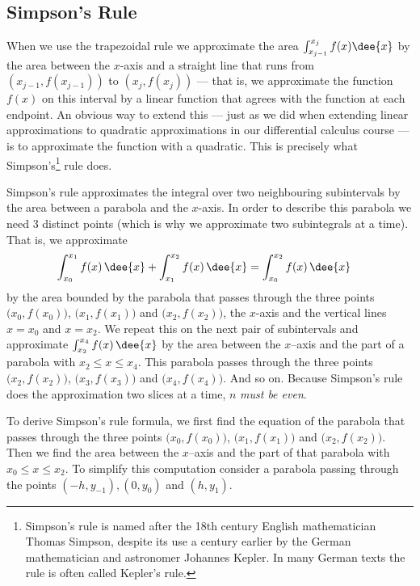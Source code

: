 \subsection{Simpson's Rule}\label{sec:Simpson}
When we use the trapezoidal rule we approximate the area
$\int_{x_{j-1}}^{x_j}f(x)\dee{x}$
by the area between the $x$-axis and a straight line that runs from
$(x_{j-1},f(x_{j-1}))$ to $(x_j, f(x_j))$ --- that is, we approximate the function $f(x)$
on this interval by a linear function that agrees with the function at each
endpoint. An obvious way to extend this --- just as we did when extending linear
approximations to quadratic approximations in our differential calculus course --- is to
approximate the function with a quadratic. This is
precisely what Simpson's\footnote{Simpson's rule is named after the 18th century English
mathematician Thomas Simpson, despite its use a century earlier by the German
mathematician and astronomer Johannes Kepler. In many German texts the rule is often
called Kepler's rule.} rule does.

Simpson's rule approximates the integral over two neighbouring subintervals by the area
between a parabola and the $x$-axis. In order to describe this parabola we need 3
distinct points (which is why we approximate two subintegrals at a time). That is, we
approximate
\begin{align*}
  \int_{x_0}^{x_1} f(x)\,\dee{x} + \int_{x_1}^{x_2} f(x)\,\dee{x}
&= \int_{x_0}^{x_2} f(x)\,\dee{x}
\end{align*}
by the area bounded by the parabola that passes through the three points
$\big(x_0,f(x_0)\big)$, $\big(x_1,f(x_1)\big)$ and $\big(x_2,f(x_2)\big)$, the $x$-axis
and the vertical lines $x=x_0$ and $x=x_2$.
We repeat this on the next pair of subintervals and approximate
$\int_{x_2}^{x_4} f(x)\,\dee{x}$ by the area between the $x$--axis and
the part of a parabola with $x_2\le x\le x_4$. This parabola passes
through the three points $\big(x_2,f(x_2)\big)$,
$\big(x_3,f(x_3)\big)$ and $\big(x_4,f(x_4)\big)$. And so on. Because Simpson's
rule does the approximation two slices at a time, $n$ \emph{must be even}.


To derive Simpson's rule formula, we first find the equation of the
parabola that passes through the three points $\big(x_0,f(x_0)\big)$,
$\big(x_1,f(x_1)\big)$ and $\big(x_2,f(x_2)\big)$. Then we find the area
between the $x$--axis and the part of that parabola with $x_0\le x\le x_2$. To simplify
this computation consider a parabola passing through the points $(-h,y_{-1}), (0,y_0)$ and
$(h,y_1)$.

